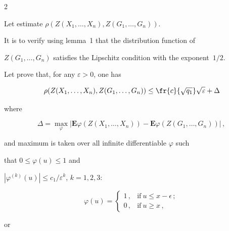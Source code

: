 \begin{multicols}{2}
\noindent

Let estimate $\rho(Z(X_1,\ldots,X_n),Z(G_1,\ldots,G_n))$.

    It is to verify using lemma~1 that the distribution function of

    $Z(G_1,\ldots,G_n)$ satisfies the Lipschitz condition with the exponent~$1/2$.



    Let prove that, for any $\varepsilon  >0$, one has

         \begin{equation}

         \label{c4}

\rho(Z(X_1,\ldots,X_n),Z(G_1,\ldots,G_n))\leq \fr{c}{\sqrt{q_1}}\sqrt{\varepsilon}+\Delta\!

    \end{equation}

where

    $$

    \Delta=\max\limits_\varphi |\mathbf{E}\varphi(Z(X_1,\ldots,X_n))-

    \mathbf{E}\varphi(Z(G_1,\ldots,G_n))|\,,  

    $$

    and maximum is taken over all infinite differentiable $\varphi$ such

    that $0 \leq\varphi(u) \leq1$ and

      $|\varphi^{(k)}(u)| \leq

    c_1/\varepsilon^{k}$, $k =1,2,3$:

    \begin{equation}

    \label{c2}

\varphi(u)=

    \begin{cases}

    1\,, &\mbox{if}\  u\leq x-\epsilon\,; \\[6pt]

    0\,, &\mbox{if}\ u\geq x\,,

    \end{cases}

\end{equation}

    or

    

    \noindent

    \begin{equation}

    \label{c3}


\end{equation}
\end{multicols}

